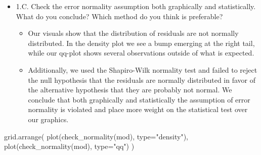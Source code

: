 \documentclass[
  letterpaper,
  DIV=11,
  numbers=noendperiod]{scrartcl}
\newenvironment{Shaded}{\begin{snugshade}}{\end{snugshade}}
\newcommand{\AttributeTok}[1]{\textcolor[rgb]{0.40,0.45,0.13}{#1}}
\newcommand{\FunctionTok}[1]{\textcolor[rgb]{0.28,0.35,0.67}{#1}}
\newcommand{\NormalTok}[1]{\textcolor[rgb]{0.00,0.23,0.31}{#1}}
\newcommand{\StringTok}[1]{\textcolor[rgb]{0.13,0.47,0.30}{#1}}
\providecommand{\tightlist}{%
  \setlength{\itemsep}{0pt}\setlength{\parskip}{0pt}}\usepackage{longtable,booktabs,array}
\begin{document}
\begin{itemize}
\item
  1.C. Check the error normality assumption both graphically and
  statistically. What do you conclude? Which method do you think is
  preferable?

  \begin{itemize}
  \tightlist
  \item
    Our visuals show that the distribution of residuals are not normally
    distributed. In the density plot we see a bump emerging at the right
    tail, while our qq-plot shows several observations outside of what
    is expected.
  \item
    Additionally, we used the Shapiro-Wilk normality test and failed to
    reject the null hypothesis that the residuals are normally
    distributed in favor of the alternative hypothesis that they are
    probably not normal. We conclude that both graphically and
    statistically the assumption of error normality is violated and
    place more weight on the statistical test over our graphics.
  \end{itemize}
\end{itemize}

\begin{Shaded}
\begin{Highlighting}[]
\FunctionTok{grid.arrange}\NormalTok{(}
  \FunctionTok{plot}\NormalTok{(}\FunctionTok{check\_normality}\NormalTok{(mod), }\AttributeTok{type=}\StringTok{"density"}\NormalTok{), }
  \FunctionTok{plot}\NormalTok{(}\FunctionTok{check\_normality}\NormalTok{(mod), }\AttributeTok{type=}\StringTok{"qq"}\NormalTok{)}
\NormalTok{)}
\end{Highlighting}
\end{Shaded}

\end{document}
